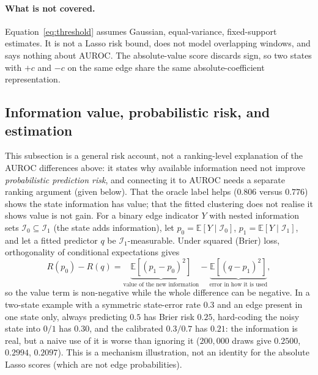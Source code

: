 \documentclass[11pt]{article}
\begin{document}
\paragraph{What is not covered.}
Equation~\eqref{eq:threshold} assumes Gaussian, equal-variance, fixed-support
estimates. It is not a Lasso risk bound, does not model overlapping windows, and
says nothing about AUROC. The absolute-value score discards sign, so two states
with $+c$ and $-c$ on the same edge share the same absolute-coefficient
representation.

\subsection{Information value, probabilistic risk, and estimation}
\label{sec:value-vs-use}

This subsection is a general risk account, not a ranking-level explanation of
the AUROC differences above: it states why available information need not
improve \emph{probabilistic prediction risk}, and connecting it to AUROC needs a
separate ranking argument (given below). That the oracle label helps ($0.806$
versus $0.776$) shows the state information has value; that the fitted
clustering does not realise it shows value is not gain. For a binary edge
indicator $Y$ with nested information sets $\mathcal I_0\subseteq\mathcal I_1$
(the state adds information), let $p_0=\mathbb E[Y\mid\mathcal I_0]$,
$p_1=\mathbb E[Y\mid\mathcal I_1]$, and let a fitted predictor $q$ be
$\mathcal I_1$-measurable. Under squared (Brier) loss, orthogonality of
conditional expectations gives
\begin{equation}
R(p_0)-R(q)
=
\underbrace{\mathbb E[(p_1-p_0)^2]}_{\text{value of the new information}}
-
\underbrace{\mathbb E[(q-p_1)^2]}_{\text{error in how it is used}},
\end{equation}
so the value term is non-negative while the whole difference can be negative. In
a two-state example with a symmetric state-error rate $0.3$ and an edge present
in one state only, always predicting $0.5$ has Brier risk $0.25$, hard-coding the
noisy state into $0/1$ has $0.30$, and the calibrated $0.3/0.7$ has $0.21$: the
information is real, but a naive use of it is worse than ignoring it
($200{,}000$ draws give $0.2500$, $0.2994$, $0.2097$). This is a mechanism
illustration, not an identity for the absolute Lasso scores (which are not edge
probabilities).
\end{document}
